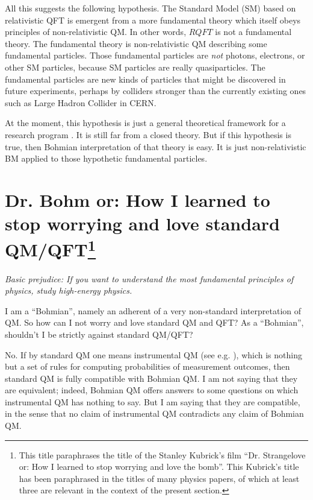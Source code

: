 \documentclass[12pt]{article}
\begin{document}
All this suggests the following hypothesis. The Standard Model (SM) based on relativistic QFT 
is emergent from a more fundamental theory 
which itself obeys principles of non-relativistic QM. In other words, 
$RQFT$ is not a fundamental theory. The fundamental theory is non-relativistic QM describing some 
fundamental particles. Those fundamental particles are {\em not} photons, electrons, or other SM particles, 
because SM particles are really quasiparticles. The fundamental particles are new kinds of particles 
that might be discovered in future experiments, perhaps by colliders stronger than the currently existing ones 
such as Large Hadron Collider in CERN.  

At the moment, this hypothesis is just a general theoretical framework for a research program \cite{volovik,wen}. 
It is still far from a closed theory. But if this hypothesis is true, then Bohmian interpretation
of that theory is easy. It is just non-relativistic BM applied to those hypothetic fundamental particles.


\section[Dr. Bohm or: How I learned to stop worrying and love standard QM/QFT]{Dr. Bohm or: 
How I learned to stop worrying and love standard QM/QFT\protect\footnote{This title paraphrases 
the title of the Stanley Kubrick's film ``Dr. Strangelove or: How I learned to stop worrying and love the bomb''.
This Kubrick's title has been paraphrased in the titles of many physics papers, of which 
at least three \cite{love1,love2,love3} are relevant in the context of the present section.}}
\label{SEClove}

\begin{flushright}
{\it Basic prejudice: If you want to understand the most fundamental principles
of physics, study high-energy physics.} 
\end{flushright}

I am a ``Bohmian'', namely an adherent of a very non-standard interpretation of QM. 
So how can I not worry and love standard QM and QFT? As a ``Bohmian'', shouldn't I be strictly against standard QM/QFT?

No. If by standard QM one means instrumental QM (see e.g. \cite{peres}),
which is nothing but a set of rules for computing probabilities of measurement outcomes,  
then standard QM is fully compatible with Bohmian QM. 
I am not saying that they are equivalent; indeed, Bohmian QM offers answers to some questions on which instrumental 
QM has nothing to say. But I am saying that they are compatible, in the sense that no claim of instrumental QM contradicts 
any claim of Bohmian QM.
\end{document}
